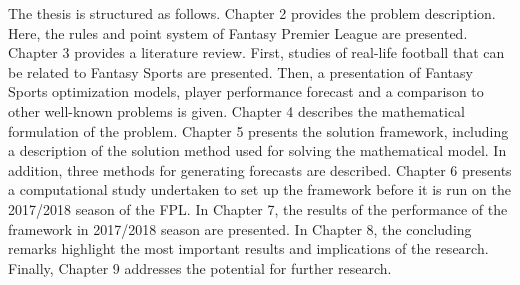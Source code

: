 The thesis is structured as follows. Chapter 2 provides the problem description. Here, the rules and point system of Fantasy Premier League are presented. Chapter 3 provides a literature review. First, studies of real-life football that can be related to Fantasy Sports are presented. Then, a presentation of Fantasy Sports optimization models, player performance forecast and a comparison to other well-known problems is given. Chapter 4 describes the mathematical formulation of the problem. Chapter 5 presents the solution framework, including a description of the solution method used for solving the mathematical model. In addition, three methods for generating forecasts are described. Chapter 6 presents a computational study undertaken to set up the framework before it is run on the 2017/2018 season of the FPL. In Chapter 7, the results of the performance of the framework in 2017/2018 season are presented. In Chapter 8, the concluding remarks highlight the most important results and implications of the research. Finally, Chapter 9 addresses the potential for further research.
